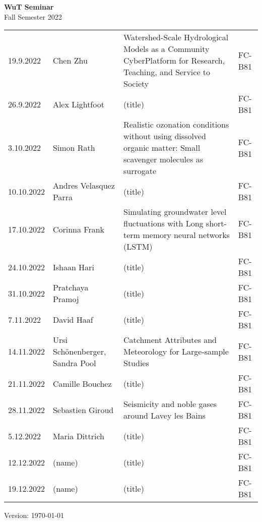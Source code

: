 \documentclass[12pt]{article}
\begin{document}
\centering

{\Huge \bf WuT Seminar}\\[1cm]
{\Large Fall Semester 2022}\\[1.8cm]





\renewcommand*\arraystretch{1.4}
\begin{tabular}{l p{3.8cm} p{8.5cm} p{2cm}}

19.9.2022
 	& Chen Zhu
 	& Watershed-Scale Hydrological Models as a Community CyberPlatform for Research, Teaching, and Service to Society
  & FC-B81\\
  
26.9.2022
 	& Alex Lightfoot
 	& (title)
 	& FC-B81\\

3.10.2022
 	& Simon Rath
 	& Realistic ozonation conditions without using dissolved organic matter: Small scavenger molecules as surrogate
 	& FC-B81\\

10.10.2022
 	& Andres Velasquez Parra
 	& (title)
 	& FC-B81\\

17.10.2022  
 	& Corinna Frank
 	& Simulating groundwater level fluctuations with Long short-term memory neural networks (LSTM)
 	& FC-B81\\
 	
24.10.2022
 	& Ishaan Hari
 	& (title)
 	& FC-B81\\

31.10.2022
 	& Pratchaya Pramoj
 	& (title)
 	& FC-B81\\

7.11.2022
 	& David Haaf
 	& (title)
 	& FC-B81\\

14.11.2022
 	& Ursi Schönenberger, Sandra Pool
 	& Catchment Attributes and Meteorology for Large-sample Studies
 	& FC-B81\\

21.11.2022
 	& Camille Bouchez
 	& (title)
 	& FC-B81\\

28.11.2022
 	& Sebastien Giroud
 	& Seismicity and noble gases around Lavey les Bains
 	& FC-B81\\

5.12.2022
 	& Maria Dittrich
 	& (title)
 	& FC-B81\\

12.12.2022
 	& (name)
 	& (title)
 	& FC-B81\\

19.12.2022
 	& (name)
 	& (title)
 	& FC-B81\\


\end{tabular}

\vfill

{\scriptsize Version: \today}
\end{document}
